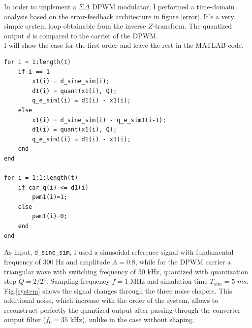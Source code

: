 \documentclass[11pt,a4paper]{article}
\begin{document}
In order to implement a $\Sigma\Delta$ DPWM modulator, I performed a time-domain analysis based on the error-feedback architecture in figure \ref{error}. It's a very simple system loop obtainable from the inverse $Z$-transform. The quantized output $d$ is compared to the carrier of the DPWM. \\
I will show the case for the first order and leave the rest in the MATLAB code.
\begin{lstlisting}
for i = 1:length(t)
	if i == 1
		x1(i) = d_sine_sim(i);
		d1(i) = quant(x1(i), Q);
		q_e_sim1(i) = d1(i) - x1(i);
	else
		x1(i) = d_sine_sim(i) - q_e_sim1(i-1);
		d1(i) = quant(x1(i), Q);
		q_e_sim1(i) = d1(i) - x1(i);
	end
end
	
for i = 1:1:length(t)
	if car_q(i) <= d1(i)  
		pwm1(i)=1;
	else
		pwm1(i)=0;
	end
end
\end{lstlisting}
As input, \texttt{d\_sine\_sim}, I used a sinusoidal reference signal with fundamental frequency of 300 Hz and amplitude $A=0.8$, while for the DPWM carrier a triangular wave with switching frequency of 50 kHz, quantized with quantization step $Q=2/2^4$. Sampling frequency $f=1$ MHz and simulation time $T_{sim}=5$ $ms$. Fig.\ref{system} shows the signal changes through the three noise shapers.
This additional noise, which increase with the order of the system, allows to reconstruct perfectly the quantized output after passing through the converter output filter ($f_0=35$ kHz), unlike in the case without shaping.
\end{document}

